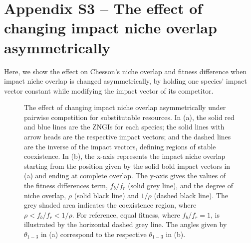 \clearpage
\section{Appendix S3 -- The effect of changing impact niche overlap asymmetrically}
Here, we show the effect on Chesson's niche overlap and fitness difference when impact niche overlap is changed asymmetrically, by holding one species' impact vector constant while modifying the impact vector of its competitor. 
\par


\begin{figure}[H]
	\centering
	\caption[The effect of changing impact niche overlap asymmetrically under pairwise competition for substitutable resources.]
		{\hspace{1mm}The effect of changing impact niche overlap asymmetrically under pairwise competition for substitutable resources. In (a), the solid red and blue lines are the ZNGIs for each species; the solid lines with arrow heads are the respective impact vectors; and the dashed lines are the inverse of the impact vectors, defining regions of stable coexistence. In (b), the x-axis represents the impact niche overlap starting from the position given by the solid bold impact vectors in (a) and ending at complete overlap. The y-axis gives the values of the fitness differences term, $f_{b}/f_{r}$ (solid grey line), and the degree of niche overlap, $\rho$ (solid black line) and $1/\rho$ (dashed black line). The grey shaded area indicates the coexistence region, where $\rho<f_{b}/f_{r}<1/\rho$. For reference, equal fitness, where $f_{b}/f_{r}=1$, is illustrated by the horizontal dashed grey line. The angles given by $\theta_{1-3}$ in (a) correspond to the respective $\theta_{1-3}$ in (b).}
	\label{fig:impact-appendix-fig-asymmetry}
\end{figure}



